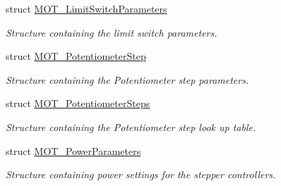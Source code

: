 \begin{DoxyCompactItemize}
struct \hyperlink{struct_m_o_t___limit_switch_parameters}{M\+O\+T\+\_\+\+Limit\+Switch\+Parameters}
\begin{DoxyCompactList}\small\item\em Structure containing the limit switch parameters. \end{DoxyCompactList}\item 
struct \hyperlink{struct_m_o_t___potentiometer_step}{M\+O\+T\+\_\+\+Potentiometer\+Step}
\begin{DoxyCompactList}\small\item\em Structure containing the Potentiometer step parameters. \end{DoxyCompactList}\item 
struct \hyperlink{struct_m_o_t___potentiometer_steps}{M\+O\+T\+\_\+\+Potentiometer\+Steps}
\begin{DoxyCompactList}\small\item\em Structure containing the Potentiometer step look up table. \end{DoxyCompactList}\item 
struct \hyperlink{struct_m_o_t___power_parameters}{M\+O\+T\+\_\+\+Power\+Parameters}
\begin{DoxyCompactList}\small\item\em Structure containing power settings for the stepper controllers. \end{DoxyCompactList}\end{DoxyCompactItemize}
